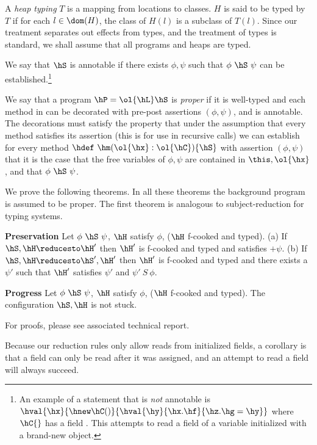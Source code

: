 A {\em heap typing} $T$ is a mapping from locations to classes. $H$ is
said to be typed by $T$ if for each $l\in\dom(H)$, the class of $H(l)$
is a subclass of $T(l)$.  Since our treatment separates out effects
from types, and the treatment of types is standard, we shall assume
that all programs and heaps are typed.

We say that $\hS$ is annotable if there exists $\phi,\psi$ such that
$\phi~\hS~\psi$ can be established.\footnote{An example of a statement that is
{\em not} annotable is $\hval{\hx}{\hnew
  \hC()}{\hval{\hy}{\hx.\hf}{\hz.\hg=\hy}}$ where $\hC{}$ has a field
\hf. This attempts to read a field of a variable initialized with a
brand-new object.}

We say that a program $\hP=\ol{\hL}\hS$ is {\em proper} if it is
well-typed and each method in \hL{} can be decorated with pre-post assertions
$(\phi,\psi)$, and \hS is annotable.
The decorations must satisfy the property that under the
assumption that every method satisfies its assertion (this is for use
in recursive calls) we can establish for every method
$\hdef~\hm(\ol{\hx}:\ol{\hC})\{\hS\}$ with assertion $(\phi,\psi)$ that
it is the case that the free variables of $\phi,\psi$ are contained in
$\this,\ol{\hx}$, and that $\phi~\hS~\psi$.

We prove the following theorems. In all these theorems the background
program \hP{} is assumed to be proper. The first theorem is analogous
to subject-reduction for typing systems.
\begin{Theorem}{\textbf{Preservation}}
Let $\phi~\hS~\psi$, $\hH$ satisfy $\phi$, ($\hH$ f-cooked and typed).
(a) If $\hS,\hH \reducesto \hH'$ then $\hH'$ is f-cooked and typed and satisfies $+\psi$.
(b) If $\hS,\hH \reducesto \hS',\hH'$ then $\hH'$ is f-cooked and typed and
there exists a $\psi'$ such
that $\hH'$ satisfies $\psi'$ and $\psi'~S~\phi$.
\end{Theorem}

\begin{Theorem}{\textbf{Progress}}
 Let $\phi~\hS~\psi$, $\hH$ satisfy $\phi$, ($\hH$ f-cooked and
 typed). The configuration $\hS,\hH$ is not stuck.
\end{Theorem}

For proofs, please see associated technical report.

Because our reduction rules only allow reads from initialized fields,
a corollary is that a field can only be read after it was assigned,
and an attempt to read a field will always succeed.
